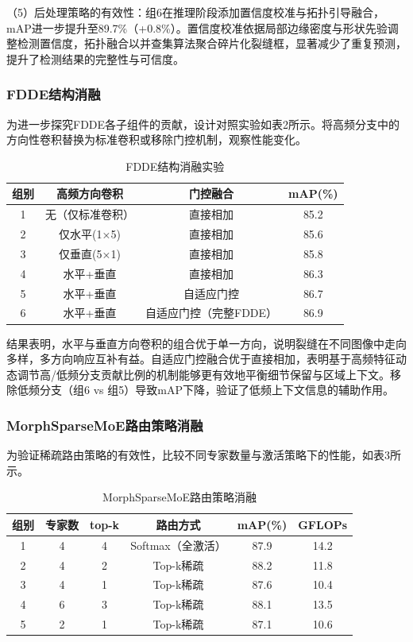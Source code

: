 \documentclass[twocolumn]{sn-jnl}
\begin{document}
	（5）后处理策略的有效性：组6在推理阶段添加置信度校准与拓扑引导融合，mAP进一步提升至89.7\%（+0.8\%）。置信度校准依据局部边缘密度与形状先验调整检测置信度，拓扑融合以并查集算法聚合碎片化裂缝框，显著减少了重复预测，提升了检测结果的完整性与可信度。
	
	\subsubsection{FDDE结构消融}
	为进一步探究FDDE各子组件的贡献，设计对照实验如表2所示。将高频分支中的方向性卷积替换为标准卷积或移除门控机制，观察性能变化。
	
	\begin{table}[htbp]
		\centering
		\caption{FDDE结构消融实验}
		\begin{tabular}{cccc}
			\toprule
			组别 & 高频方向卷积 & 门控融合 & mAP(\%) \\
			\midrule
			1 & 无（仅标准卷积） & 直接相加 & 85.2 \\
			2 & 仅水平(1×5) & 直接相加 & 85.6 \\
			3 & 仅垂直(5×1) & 直接相加 & 85.8 \\
			4 & 水平+垂直 & 直接相加 & 86.3 \\
			5 & 水平+垂直 & 自适应门控 & 86.7 \\
			6 & 水平+垂直 & 自适应门控（完整FDDE） & 86.9 \\
			\bottomrule
		\end{tabular}
		\label{tab:fdde}
	\end{table}
	
	结果表明，水平与垂直方向卷积的组合优于单一方向，说明裂缝在不同图像中走向多样，多方向响应互补有益。自适应门控融合优于直接相加，表明基于高频特征动态调节高/低频分支贡献比例的机制能够更有效地平衡细节保留与区域上下文。移除低频分支（组6 vs 组5）导致mAP下降，验证了低频上下文信息的辅助作用。
	
	\subsubsection{MorphSparseMoE路由策略消融}
	为验证稀疏路由策略的有效性，比较不同专家数量与激活策略下的性能，如表3所示。
	
	\begin{table}[htbp]
		\centering
		\caption{MorphSparseMoE路由策略消融}
		\begin{tabular}{cccccc}
			\toprule
			组别 & 专家数 & top-k & 路由方式 & mAP(\%) & GFLOPs \\
			\midrule
			1 & 4 & 4 & Softmax（全激活） & 87.9 & 14.2 \\
			2 & 4 & 2 & Top-k稀疏 & 88.2 & 11.8 \\
			3 & 4 & 1 & Top-k稀疏 & 87.6 & 10.4 \\
			4 & 6 & 3 & Top-k稀疏 & 88.1 & 13.5 \\
			5 & 2 & 1 & Top-k稀疏 & 87.1 & 10.6 \\
			\bottomrule
		\end{tabular}
		\label{tab:moe}
	\end{table}
	
\end{document}
